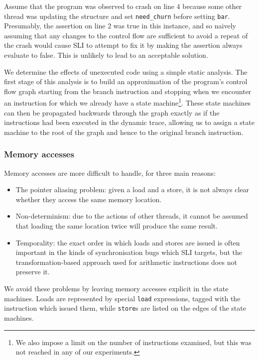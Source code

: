 \documentclass[10pt,twocolumn,preprint,natbib,authoryear]{sigplanconf}
\newcommand{\editorial}[1]{}
\newcommand{\needCite}{\editorial{need cite}}
\begin{document}
Assume that the program was observed to crash on line 4 because some
other thread was updating the structure and set \verb|need_churn|
before setting \verb|bar|.  Presumably, the assertion on line 2 was
true in this instance, and so naively assuming that any changes to the
control flow are sufficient to avoid a repeat of the crash would cause
SLI to attempt to fix it by making the assertion always evaluate to
false.  This is unlikely to lead to an acceptable solution.

We determine the effects of unexecuted code using a simple static
analysis.  The first stage of this analysis is to build an
approximation of the program's control flow graph starting from the
branch instruction and stopping when we encounter an instruction for
which we already have a state machine\footnote{We also impose a limit
  on the number of instructions examined, but this was not reached in
  any of our experiments.}.  These state machines can then be
propagated backwards through the graph exactly as if the instructions
had been executed in the dynamic trace, allowing us to assign a state
machine to the root of the graph and hence to the original branch
instruction.

\subsubsection{Memory accesses}

Memory accesses are more difficult to handle, for three main reasons:

\begin{itemize}
\item The pointer aliasing problem\needCite{}: given a load and a
  store, it is not always clear whether they access the same memory
  location.
\item Non-determinism: due to the actions of other threads, it cannot
  be assumed that loading the same location twice will produce the
  same result.
\item Temporality: the exact order in which loads and stores are
  issued is often important in the kinds of synchronisation bugs which
  SLI targets, but the transformation-based approach used for
  arithmetic instructions does not preserve it.
\end{itemize}

We avoid these problems by leaving memory accesses explicit in the
state machines.  Loads are represented by special \verb|load|
expressions, tagged with the instruction which issued them, while
\verb|store|s are listed on the edges of the state machines.
\end{document}
